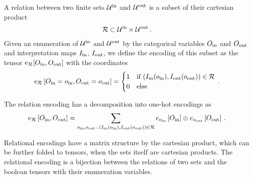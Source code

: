 \begin{definition}
    A relation between two finite sets $\mathcal{U}^{\mathrm{in}}$ and $\mathcal{U}^{\mathrm{out}}$ is a subset of their cartesian product
    \begin{align*}
        \mathcal{R} \subset \mathcal{U}^{\mathrm{in}} \times \mathcal{U}^{\mathrm{out}} \, .
    \end{align*}
    Given an enumeration of $\mathcal{U}^{\mathrm{in}}$ and $\mathcal{U}^{\mathrm{out}}$ by the categorical variables $O_{\mathrm{in}}$ and $O_{\mathrm{out}}$ and interpretation maps $I_{\mathrm{in}}$, $I_{\mathrm{out}}$, we define the encoding of this subset as the tensor $e_{\mathcal{R}}[O_{\mathrm{in}},O_{\mathrm{out}}]$ with the coordinates
    \begin{align*}
        e_{\mathcal{R}}\left[O_{\mathrm{in}}=o_{\mathrm{in}},O_{\mathrm{out}}=o_{\mathrm{out}}\right]
        = \begin{cases}
              1 & \text{if } (I_{\mathrm{in}}(o_{\mathrm{in}}),I_{\mathrm{out}}(o_{\mathrm{out}})) \in \mathcal{R} \\
              0 & \text{else}
        \end{cases} \, .
    \end{align*}
\end{definition}

The relation encoding has a decomposition into one-hot encodings as
\begin{align*}
    e_{\mathcal{R}}\left[O_{\mathrm{in}},O_{\mathrm{out}}\right]
    = \sum_{o_{\mathrm{in}},o_{\mathrm{out}} \, : \, (I_{\mathrm{in}}(o_{\mathrm{in}}),I_{\mathrm{out}}(o_{\mathrm{out}})) \in \mathcal{R}}
    e_{o_{\mathrm{in}}}\left[O_{\mathrm{in}}\right]  \otimes e_{o_{\mathrm{out}}}\left[O_{\mathrm{out}}\right]  \, .
\end{align*}

Relational encodings have a matrix structure by the cartesian product, which can be further folded to tensors, when the sets itself are cartesian products.
The relational encoding is a bijection between the relations of two sets and the boolean tensors with their enumeration variables.

%



